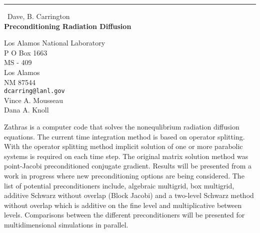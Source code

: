 \documentclass{report}
\begin{document}
\begin{center}
\rule{6in}{1pt} \
{\large Dave, B. Carrington \\
{\bf Preconditioning Radiation Diffusion}}

Los Alamos National Laboratory \\ P O Box 1663 \\ MS - 409 \\ Los Alamos \\ NM 87544
\\
{\tt dcarring@lanl.gov}\\
Vince A. Mousseau\\
Dana A. Knoll\end{center}

Zathras is a computer code that solves the nonequlibrium radiation
diffusion equations. The current time integration method is based on
operator splitting. With the operator splitting method implicit solution
of one or more parabolic systems is required on each time step. The
original matrix solution method was point-Jacobi preconditioned conjugate
gradient. Results will be presented from a work in progress where new
preconditioning options are being considered. The list of potential
preconditioners include, algebraic multigrid, box multigrid, additive
Schwarz
without overlap (Block Jacobi) and a two-level Schwarz method without
overlap which is additive on the fine level and multiplicative between
levels. Comparisons between the different preconditioners will be
presented for multidimensional simulations in parallel.
\end{document}
